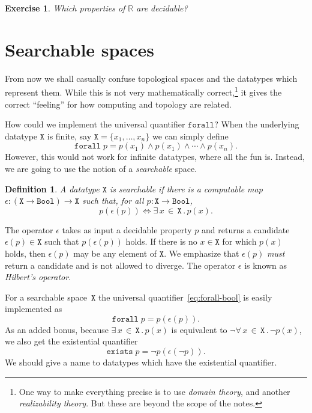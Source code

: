 \documentclass[a4paper,10pt]{article}
\newtheorem{exercise}[theorem]{Exercise}
\newtheorem{definition}[theorem]{Definition}
\newcommand{\RR}{\mathbb{R}}
\newcommand{\set}[1]{\{#1\}}
\newcommand{\Bool}{\mathtt{Bool}}
\newcommand{\xall}[3]{\forall\, #1 \,{\in}\, #2\,.\,#3}
\newcommand{\xsome}[3]{\exists\, #1 \,{\in}\, #2\,.\,#3}
\begin{document}
\begin{exercise}
  Which properties of $\RR$ are decidable?
\end{exercise}

\section{Searchable spaces}
\label{sec:searchable-spaces}

From now we shall casually confuse topological spaces and the
datatypes which represent them. While this is not very mathematically
correct,\footnote{One way to make everything precise is to use
  \emph{domain theory}, and another \emph{realizability theory}. But
  these are beyond the scope of the notes.} it gives the correct
``feeling'' for how computing and topology are related.

How could we implement the universal quantifier $\mathtt{forall}$?
When the underlying datatype $\mathtt{X}$ is finite, say $\mathtt{X} =
\set{x_1, \ldots, x_n}$ we can simply define
%
\begin{equation*}
  \mathtt{forall}\; p = p(x_1) \land p(x_1) \land \cdots \land p(x_n).
\end{equation*}
%
However, this would not work for infinite datatypes, where all the fun
is. Instead, we are going to use the notion of a \emph{searchable} space.

\begin{definition}
  A datatype $\mathtt{X}$ is \emph{searchable} if there is a
  computable map $\epsilon : (\mathtt{X} \to \Bool) \to \mathtt{X}$
  such that, for all $p : \mathtt{X} \to \Bool$,
  \begin{equation*}
    p (\epsilon(p)) \iff \xsome{x}{\mathtt{X}}{p(x)}.
  \end{equation*}
\end{definition}

The operator $\epsilon$ takes as input a decidable property $p$ and
returns a candidate $\epsilon(p) \in \mathtt{X}$ such that
$p(\epsilon(p))$ holds. If there is no $x \in \mathtt{X}$ for which
$p(x)$ holds, then $\epsilon(p)$ may be any element of $\mathtt{X}$.
We emphasize that $\epsilon(p)$ \emph{must} return a candidate and is
not allowed to diverge. The operator $\epsilon$ is known as
\emph{Hilbert's operator}.

For a searchable space~$\mathtt{X}$ the universal
quantifier~\eqref{eq:forall-bool} is easily implemented as
%
\begin{equation*}
  \mathtt{forall} \; p = p (\epsilon(p)).
\end{equation*}
%
As an added bonus, because $\xsome{x}{\mathtt{X}}{p(x)}$ is equivalent
to $\lnot\xall{x}{\mathtt{X}}{\lnot p(x)}$, we also get the
existential quantifier
%
\begin{equation*}
  \mathtt{exists} \; p = \lnot p(\epsilon (\lnot p)).
\end{equation*}
%
We should give a name to datatypes which have the existential
quantifier.
\end{document}
